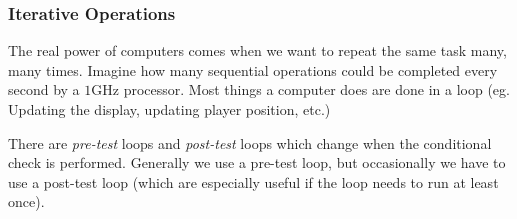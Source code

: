 \subsubsection{Iterative Operations}\label{ssub:iterative_operations}

The real power of computers comes when we want to repeat the same task many, many times.
Imagine how many sequential operations could be completed every second by a \(1 \mathrm{GHz}\) processor.
Most things a computer does are done in a loop (eg. Updating the display, updating player position, etc.)

There are \emph{pre-test} loops and \emph{post-test} loops which change when the conditional check is performed.
Generally we use a pre-test loop, but occasionally we have to use a post-test loop (which are especially useful if the loop needs to run at least once).

